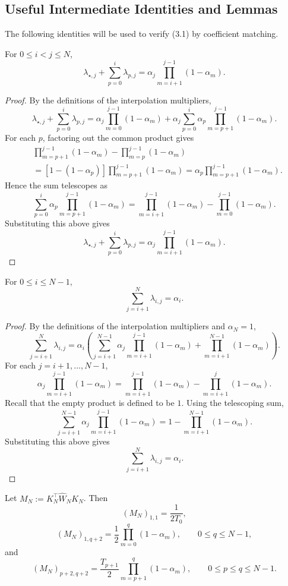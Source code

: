 \subsection{Useful Intermediate Identities and Lemmas}
The following identities will be used to verify (3.1) by coefficient matching.
\begin{lemma}\label{lem:lambda-partial-sum}
For $0\le i<j\le N$,
\[ \lambda_{\star,j}+\sum_{p=0}^{i}\lambda_{p,j} =\alpha_j\prod_{m=i+1}^{j-1}(1-\alpha_m). \]
\end{lemma}
\begin{proof}
By the definitions of the interpolation multipliers,
\[\lambda_{\star,j}+\sum_{p=0}^{i}\lambda_{p,j}
=\alpha_j\prod_{m=0}^{j-1}(1-\alpha_m)
+\alpha_j\sum_{p=0}^{i}\alpha_p\prod_{m=p+1}^{j-1}(1-\alpha_m).\]
For each $p$, factoring out the common product gives
\[\begin{aligned}
&\prod_{m=p+1}^{j-1}(1-\alpha_m)-\prod_{m=p}^{j-1}(1-\alpha_m)\\
&=[1-(1-\alpha_p)]\prod_{m=p+1}^{j-1}(1-\alpha_m)
=\alpha_p\prod_{m=p+1}^{j-1}(1-\alpha_m).
\end{aligned} \]
Hence the sum telescopes as
\[\sum_{p=0}^{i}\alpha_p\prod_{m=p+1}^{j-1}(1-\alpha_m)
=\prod_{m=i+1}^{j-1}(1-\alpha_m)-\prod_{m=0}^{j-1}(1-\alpha_m).\]
Substituting this above gives
\[\lambda_{\star,j}+\sum_{p=0}^{i}\lambda_{p,j} =\alpha_j\prod_{m=i+1}^{j-1}(1-\alpha_m). \]
\end{proof}
\begin{lemma}\label{lem:lambda-outgoing-sum}
For $0\le i\le N-1$,
\[\sum_{j=i+1}^{N}\lambda_{i,j}=\alpha_i.\]
\end{lemma}
\begin{proof}
By the definitions of the interpolation multipliers and $\alpha_N=1$,
\[ \sum_{j=i+1}^{N}\lambda_{i,j}
=\alpha_i\left(\sum_{j=i+1}^{N-1}\alpha_j\prod_{m=i+1}^{j-1}(1-\alpha_m)
+\prod_{m=i+1}^{N-1}(1-\alpha_m)\right). \]
For each $j=i+1,\ldots,N-1$,
\[ \alpha_j\prod_{m=i+1}^{j-1}(1-\alpha_m)
=\prod_{m=i+1}^{j-1}(1-\alpha_m)-\prod_{m=i+1}^{j}(1-\alpha_m). \]
Recall that the empty product is defined to be $1$. Using the telescoping sum, \[ \sum_{j=i+1}^{N-1}\alpha_j\prod_{m=i+1}^{j-1}(1-\alpha_m)
=1-\prod_{m=i+1}^{N-1}(1-\alpha_m). \]
Substituting this above gives
\[ \sum_{j=i+1}^{N}\lambda_{i,j}=\alpha_i. \]
\end{proof}
\begin{lemma}\label{lem:gram-kernel}
Let $M_N:=K_N^\top\widehat W_NK_N$. Then
\[(M_N)_{1,1}=\frac{1}{2T_0},\]
\[(M_N)_{1,q+2}=\frac12\prod_{m=0}^{q}(1-\alpha_m), \qquad 0\le q\le N-1,\]
and
\[(M_N)_{p+2,q+2} =\frac{T_{p+1}}2\prod_{m=p+1}^{q}(1-\alpha_m),\qquad 0\le p\le q\le N-1.\]
\end{lemma}
